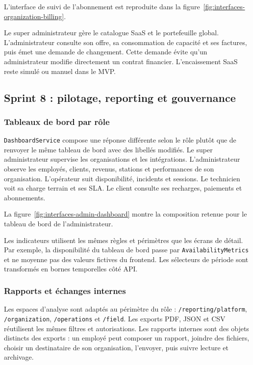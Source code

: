 L'interface de suivi de l'abonnement est reproduite dans la
figure~\ref{fig:interfaces-organization-billing}.

Le super administrateur gère le catalogue SaaS et le portefeuille global.
L'administrateur consulte son offre, sa consommation de capacité et ses factures,
puis émet une demande de changement. Cette demande évite qu'un administrateur
modifie directement un contrat financier. L'encaissement SaaS reste simulé ou
manuel dans le MVP.

\subsection{Sprint 8 : pilotage, reporting et gouvernance}

\subsubsection{Tableaux de bord par rôle}

\texttt{DashboardService} compose une réponse différente selon le rôle plutôt que
de renvoyer le même tableau de bord avec des libellés modifiés. Le super
administrateur supervise les organisations et les intégrations. L'administrateur
observe les employés, clients, revenus, stations et performances de son
organisation. L'opérateur suit disponibilité, incidents et sessions. Le
technicien voit sa charge terrain et ses SLA. Le client consulte ses recharges,
paiements et abonnements.

La figure~\ref{fig:interfaces-admin-dashboard} montre la composition retenue
pour le tableau de bord de l'administrateur.

Les indicateurs utilisent les mêmes règles et périmètres que les écrans de détail.
Par exemple, la disponibilité du tableau de bord passe par
\texttt{AvailabilityMetrics} et ne moyenne pas des valeurs fictives du frontend.
Les sélecteurs de période sont transformés en bornes temporelles côté API.

\subsubsection{Rapports et échanges internes}

Les espaces d'analyse sont adaptés au périmètre du rôle :
\texttt{/reporting/platform}, \texttt{/organization},
\texttt{/operations} et \texttt{/field}. Les exports PDF, JSON et CSV réutilisent
les mêmes filtres et autorisations. Les rapports internes sont des objets
distincts des exports : un employé peut composer un rapport, joindre des fichiers,
choisir un destinataire de son organisation, l'envoyer, puis suivre lecture et
archivage.


